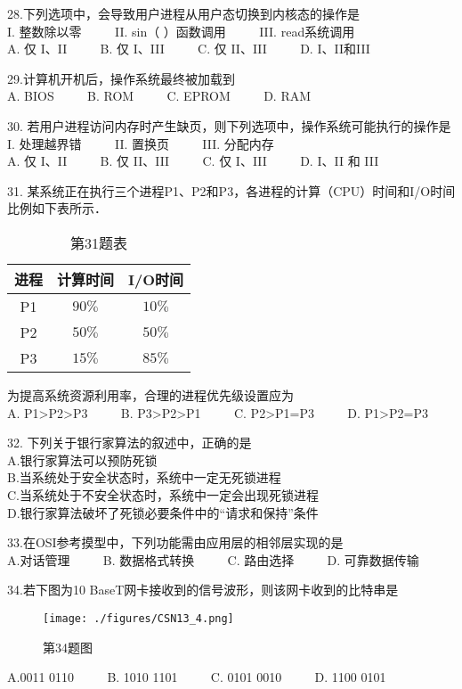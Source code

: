 28.下列选项中，会导致用户进程从用户态切换到内核态的操作是 \\
I. 整数除以零  $\qquad$  II. sin（ ）函数调用  $\qquad$   III. read系统调用 \\
A. 仅 I、II $\qquad$ B. 仅 I、III $\qquad$ C. 仅 II、III $\qquad$ D. I、II和III

29.计算机开机后，操作系统最终被加载到 \\
    A. BIOS $\qquad$ B. ROM $\qquad$ C. EPROM $\qquad$ D. RAM 

30. 若用户进程访问内存时产生缺页，则下列选项中，操作系统可能执行的操作是 \\
    I. 处理越界错 $\qquad$ II. 置换页 $\qquad$ III. 分配内存 \\
    A. 仅 I、II $\qquad$ B. 仅 II、III $\qquad$ C. 仅 I、III $\qquad$ D. I、II 和 III 

31. 某系统正在执行三个进程P1、P2和P3，各进程的计算（CPU）时间和I/O时间比例如下表所示． \\
\begin{table}[ht]
\centering
\caption{第31题表}\label{CSN13_tab3}
\begin{tabular}{|c|c|c|}
\hline
进程 & 计算时间 & I/O时间 \\
\hline
P1 & $90\%$ & $10\%$ \\
\hline
P2 & $50\%$ & $50\%$ \\
\hline
P3 & $15\%$ & $85\%$ \\
\hline
\end{tabular}
\end{table}
为提高系统资源利用率，合理的进程优先级设置应为 \\
    A. P1>P2>P3 $\qquad$ B. P3>P2>P1 $\qquad$ C. P2>P1=P3 $\qquad$ D. P1>P2=P3

32. 下列关于银行家算法的叙述中，正确的是 \\
A.银行家算法可以预防死锁 \\
B.当系统处于安全状态时，系统中一定无死锁进程 \\
C.当系统处于不安全状态时，系统中一定会出现死锁进程 \\
D.银行家算法破坏了死锁必要条件中的“请求和保持”条件

33.在OSI参考摸型中，下列功能需由应用层的相邻层实现的是 \\
A.对话管理 $\qquad$ B. 数据格式转换 $\qquad$ C. 路由选择 $\qquad$ D. 可靠数据传输

34.若下图为10 BaseT网卡接收到的信号波形，则该网卡收到的比特串是 \\
\begin{figure}[ht]
\centering
\texttt{[image: ./figures/CSN13\_4.png]}
\caption{第34题图} \label{CSN13_fig4}
\end{figure}
A.0011 0110 $\qquad$ B. 1010 1101 $\qquad$ C. 0101 0010 $\qquad$ D. 1100 0101

